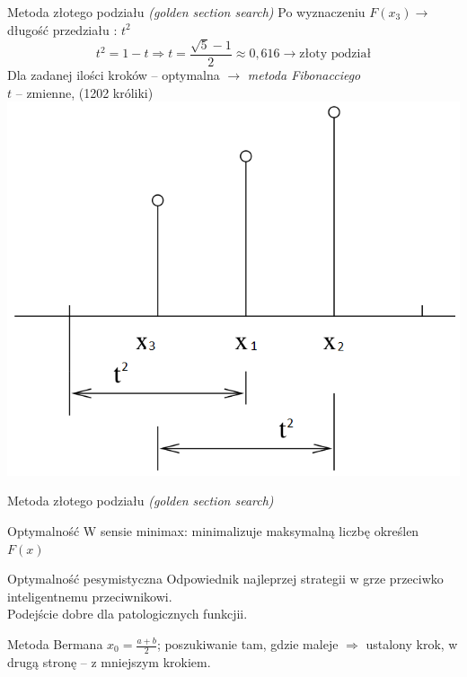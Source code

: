   \begin{frame}{Metoda złotego podziału \emph{(golden section search)}}
    Po wyznaczeniu $F(x_3) \to$ długość przedziału : $t^{2}$
    \begin{displaymath}
      t^{2} = 1 - t \Rightarrow t = \frac{\sqrt{5} - 1}{2} \approx 0,616 \to \text{złoty podział}
    \end{displaymath}
    Dla zadanej ilości kroków -- optymalna $\to$ \emph{metoda Fibonacciego}\\
    $t$ -- zmienne, (1202 króliki)\\
    \centering
    \includegraphics[height=0.55\textheight]{img/17/fibb}
  \end{frame}

  \begin{frame}{Metoda złotego podziału \emph{(golden section search)}}
    \begin{block}{Optymalność}
      W sensie minimax: minimalizuje maksymalną liczbę określen
      $F(x)$
    \end{block}
    \begin{block}{Optymalność pesymistyczna}
      Odpowiednik najleprzej strategii w grze przeciwko
      inteligentnemu przeciwnikowi.\\
      Podejście dobre dla patologicznych funkcjii.
    \end{block}
    \begin{block}{Metoda Bermana}
      $x_{0} = \frac{a + b}{2}$; poszukiwanie tam, gdzie maleje
      $\Rightarrow$ ustalony krok, w drugą stronę -- z mniejszym krokiem.
    \end{block}
  \end{frame}
